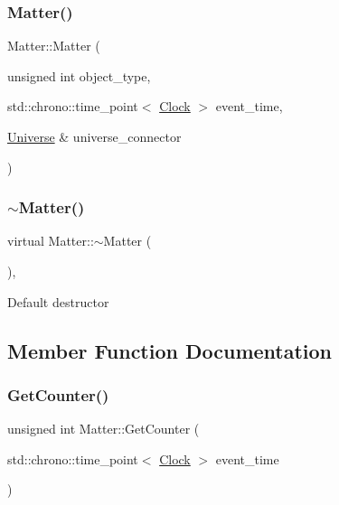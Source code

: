 \subsubsection{\texorpdfstring{Matter()}{Matter()}\hspace{0.1cm}{\footnotesize\ttfamily [4/4]}}
{\footnotesize\ttfamily Matter\+::\+Matter (\begin{DoxyParamCaption}\item[{unsigned int}]{object\+\_\+type,  }\item[{std\+::chrono\+::time\+\_\+point$<$ \mbox{\hyperlink{universe_8h_a0ef8d951d1ca5ab3cfaf7ab4c7a6fd80}{Clock}} $>$}]{event\+\_\+time,  }\item[{\mbox{\hyperlink{classUniverse}{Universe}} \&}]{universe\+\_\+connector }\end{DoxyParamCaption})\hspace{0.3cm}{\ttfamily [inline]}}

\mbox{\label{classMatter_a646fca3d4176950aed6173e1378664e3}} 
\subsubsection{\texorpdfstring{$\sim$\+Matter()}{~Matter()}}
{\footnotesize\ttfamily virtual Matter\+::$\sim$\+Matter (\begin{DoxyParamCaption}{ }\end{DoxyParamCaption})\hspace{0.3cm}{\ttfamily [inline]}, {\ttfamily [virtual]}}

Default destructor 

\subsection{Member Function Documentation}
\mbox{\label{classMatter_ac667a2f3b6d5d2ce8469efe1596cdd62}} 
\subsubsection{\texorpdfstring{Get\+Counter()}{GetCounter()}}
{\footnotesize\ttfamily unsigned int Matter\+::\+Get\+Counter (\begin{DoxyParamCaption}\item[{std\+::chrono\+::time\+\_\+point$<$ \mbox{\hyperlink{universe_8h_a0ef8d951d1ca5ab3cfaf7ab4c7a6fd80}{Clock}} $>$}]{event\+\_\+time }\end{DoxyParamCaption})\hspace{0.3cm}{\ttfamily [inline]}}

